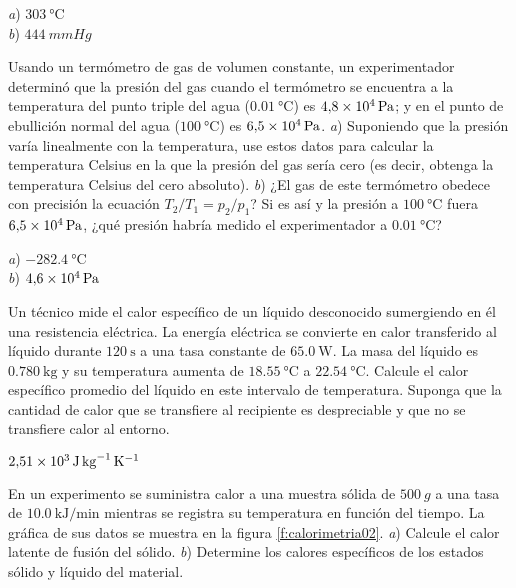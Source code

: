 \begin{Answer}
	\begin{minipage}[t]{.4\textwidth}
    \textit{a}) $\SI{303}{\celsius}$\\ \textit{b}) $\SI{444}{mmHg}$
  \end{minipage}
\end{Answer}
%
\begin{Exercise}
  Usando un termómetro de gas de volumen constante, un experimentador determinó que la presión del gas cuando el termómetro se encuentra a la temperatura del punto triple del agua ($\SI{0.01}{\celsius}$) es $\SI{4.8E4}{\pascal}$; y en el  punto de ebullición normal del agua ($\SI{100}{\celsius}$) es $\SI{6.5E4}{\pascal}$. \textit{a}) Suponiendo que la presión varía linealmente con la temperatura, use estos datos para calcular la temperatura Celsius en la que la presión del gas sería cero (es decir, obtenga la temperatura Celsius del cero absoluto). \textit{b}) ¿El gas de este termómetro obedece con precisión la ecuación $T_2/T_1=p_2/p_1$? Si es así y la presión a $\SI{100}{\celsius}$ fuera $\SI{6.5E4}{\pascal}$, ¿qué presión habría medido el experimentador a $\SI{0.01}{\celsius}$?
\end{Exercise}
\begin{Answer}
	\begin{minipage}[t]{.4\textwidth}
    \textit{a}) $\SI{-282.4}{\celsius}$\\ \textit{b}) $\SI{4.6E4}{\pascal}$
  \end{minipage}
\end{Answer}
%
\begin{Exercise}\label{p:calorimetria01}
  Un técnico mide el calor específico de un líquido desconocido sumergiendo en él una resistencia eléctrica. La energía eléctrica se convierte en calor transferido al líquido durante $\SI{120}{\second}$ a una tasa constante de $\SI{65.0}{\watt}$. La masa del líquido es $\SI{0.780}{\kilogram}$ y su temperatura aumenta de $\SI{18.55}{\celsius}$ a $\SI{22.54}{\celsius}$. Calcule el calor específico promedio del líquido en este intervalo de temperatura. Suponga que la cantidad de calor que se transfiere al recipiente es despreciable y que no se transfiere calor al entorno.
\end{Exercise}
\begin{Answer}
  $\SI{2.51E3}{\joule.\kilogram^{-1}.\kelvin^{-1}}$
\end{Answer}
%
\begin{Exercise}\label{p:calorimetria02}
    {}{}
  En un experimento se suministra calor a una muestra sólida de $\SI{500}{g}$ a una tasa de $\SI{10.0}{\kilo\joule/\minute}$ mientras se registra su temperatura en función del tiempo. La gráfica de sus datos se muestra en la figura \ref{f:calorimetria02}. \textit{a}) Calcule el calor latente de fusión del sólido. \textit{b}) Determine los calores específicos de los estados sólido y líquido del material.
\end{Exercise}
